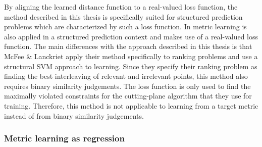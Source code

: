 By aligning the learned distance function to a real-valued loss function, the method described in this thesis is specifically suited for structured prediction problems which are characterized by such a loss function. In\cite{mcfee2010metric} metric learning is also applied in a structured prediction context and makes use of a real-valued loss function. The main differences with the approach described in this thesis is that McFee \& Lanckriet apply their method specifically to ranking problems and use a structural \ac{SVM} approach to learning. Since they specify their ranking problem as finding the best interleaving of relevant and irrelevant points, this method also requires binary similarity judgements. The loss function is only used to find the maximally violated constraints for the cutting-plane algorithm that they use for training. Therefore, this method is not applicable to learning from a target metric instead of from binary similarity judgements. 




\subsubsection{Metric learning as regression}






